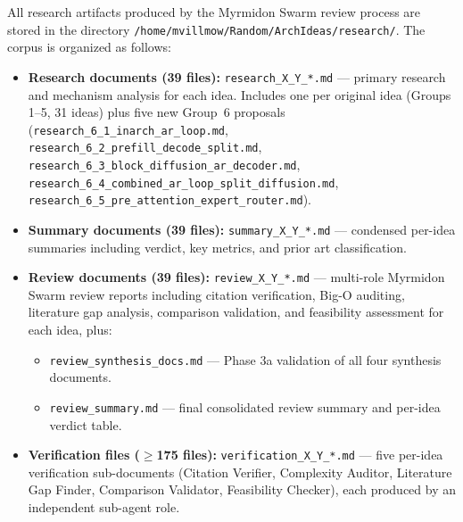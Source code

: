 \documentclass[11pt]{article}
\begin{document}
All research artifacts produced by the Myrmidon Swarm review process are stored in the directory \texttt{/home/mvillmow/Random/ArchIdeas/research/}. The corpus is organized as follows:

\begin{itemize}
    \item \textbf{Research documents (39 files):} \texttt{research\_X\_Y\_*.md} --- primary research and mechanism analysis for each idea. Includes one per original idea (Groups 1--5, 31 ideas) plus five new Group~6 proposals (\texttt{research\_6\_1\_inarch\_ar\_loop.md}, \texttt{research\_6\_2\_prefill\_decode\_split.md}, \texttt{research\_6\_3\_block\_diffusion\_ar\_decoder.md}, \texttt{research\_6\_4\_combined\_ar\_loop\_split\_diffusion.md}, \texttt{research\_6\_5\_pre\_attention\_expert\_router.md}).

    \item \textbf{Summary documents (39 files):} \texttt{summary\_X\_Y\_*.md} --- condensed per-idea summaries including verdict, key metrics, and prior art classification.

    \item \textbf{Review documents (39 files):} \texttt{review\_X\_Y\_*.md} --- multi-role Myrmidon Swarm review reports including citation verification, Big-O auditing, literature gap analysis, comparison validation, and feasibility assessment for each idea, plus:
    \begin{itemize}
        \item \texttt{review\_synthesis\_docs.md} --- Phase 3a validation of all four synthesis documents.
        \item \texttt{review\_summary.md} --- final consolidated review summary and per-idea verdict table.
    \end{itemize}

    \item \textbf{Verification files ($\geq$175 files):} \texttt{verification\_X\_Y\_*.md} --- five per-idea verification sub-documents (Citation Verifier, Complexity Auditor, Literature Gap Finder, Comparison Validator, Feasibility Checker), each produced by an independent sub-agent role.


\end{itemize}
\end{document}
